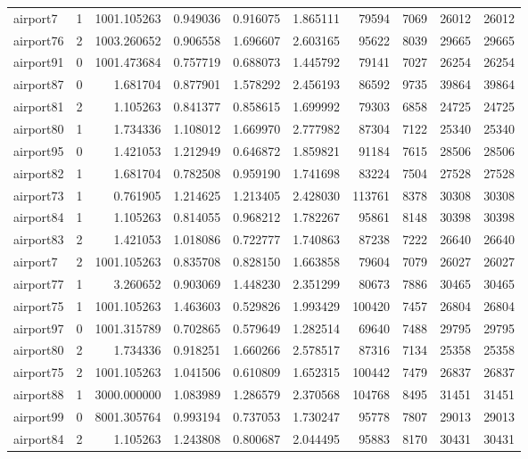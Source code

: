 \begin{longtable}{|l|r|r|r|r|r|r|r|r|r|}
airport7 & 1 & 1001.105263 & 0.949036 & 0.916075 & 1.865111 & 79594 & 7069 & 26012 & 26012 \\
airport76 & 2 & 1003.260652 & 0.906558 & 1.696607 & 2.603165 & 95622 & 8039 & 29665 & 29665 \\
airport91 & 0 & 1001.473684 & 0.757719 & 0.688073 & 1.445792 & 79141 & 7027 & 26254 & 26254 \\
airport87 & 0 & 1.681704 & 0.877901 & 1.578292 & 2.456193 & 86592 & 9735 & 39864 & 39864 \\
airport81 & 2 & 1.105263 & 0.841377 & 0.858615 & 1.699992 & 79303 & 6858 & 24725 & 24725 \\
airport80 & 1 & 1.734336 & 1.108012 & 1.669970 & 2.777982 & 87304 & 7122 & 25340 & 25340 \\
airport95 & 0 & 1.421053 & 1.212949 & 0.646872 & 1.859821 & 91184 & 7615 & 28506 & 28506 \\
airport82 & 1 & 1.681704 & 0.782508 & 0.959190 & 1.741698 & 83224 & 7504 & 27528 & 27528 \\
airport73 & 1 & 0.761905 & 1.214625 & 1.213405 & 2.428030 & 113761 & 8378 & 30308 & 30308 \\
airport84 & 1 & 1.105263 & 0.814055 & 0.968212 & 1.782267 & 95861 & 8148 & 30398 & 30398 \\
airport83 & 2 & 1.421053 & 1.018086 & 0.722777 & 1.740863 & 87238 & 7222 & 26640 & 26640 \\
airport7 & 2 & 1001.105263 & 0.835708 & 0.828150 & 1.663858 & 79604 & 7079 & 26027 & 26027 \\
airport77 & 1 & 3.260652 & 0.903069 & 1.448230 & 2.351299 & 80673 & 7886 & 30465 & 30465 \\
airport75 & 1 & 1001.105263 & 1.463603 & 0.529826 & 1.993429 & 100420 & 7457 & 26804 & 26804 \\
airport97 & 0 & 1001.315789 & 0.702865 & 0.579649 & 1.282514 & 69640 & 7488 & 29795 & 29795 \\
airport80 & 2 & 1.734336 & 0.918251 & 1.660266 & 2.578517 & 87316 & 7134 & 25358 & 25358 \\
airport75 & 2 & 1001.105263 & 1.041506 & 0.610809 & 1.652315 & 100442 & 7479 & 26837 & 26837 \\
airport88 & 1 & 3000.000000 & 1.083989 & 1.286579 & 2.370568 & 104768 & 8495 & 31451 & 31451 \\
airport99 & 0 & 8001.305764 & 0.993194 & 0.737053 & 1.730247 & 95778 & 7807 & 29013 & 29013 \\
airport84 & 2 & 1.105263 & 1.243808 & 0.800687 & 2.044495 & 95883 & 8170 & 30431 & 30431 \\

\end{longtable}
